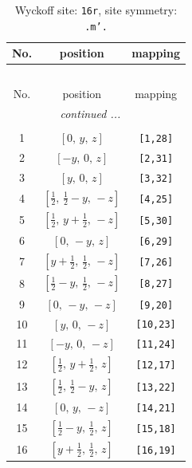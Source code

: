 \documentclass[fleqn,8pt]{jsarticle}
\begin{document}
\renewcommand{\arraystretch}{1.2}
\begin{longtable}{ccc}
\caption{Wyckoff site: {\tt 16r}, site symmetry: {\tt .m'.}}
 \\
 \hline \hline
No. & position & mapping \\ \hline \endfirsthead

\multicolumn{2}{l}{\tablename\ \thetable{}} \\
 \hline \hline
No. & position & mapping \\ \hline \endhead

 \hline \hline
\multicolumn{2}{r}{\footnotesize\it continued ...} \\ \endfoot

 \hline \hline
\multicolumn{2}{r}{} \\ \endlastfoot

1 & $\left[ 0,\, y,\, z \right]$ & {\tt [1,28]} \\ \hline
2 & $\left[ - y,\, 0,\, z \right]$ & {\tt [2,31]} \\ \hline
3 & $\left[ y,\, 0,\, z \right]$ & {\tt [3,32]} \\ \hline
4 & $\left[ \frac{1}{2},\, \frac{1}{2} - y,\, - z \right]$ & {\tt [4,25]} \\ \hline
5 & $\left[ \frac{1}{2},\, y + \frac{1}{2},\, - z \right]$ & {\tt [5,30]} \\ \hline
6 & $\left[ 0,\, - y,\, z \right]$ & {\tt [6,29]} \\ \hline
7 & $\left[ y + \frac{1}{2},\, \frac{1}{2},\, - z \right]$ & {\tt [7,26]} \\ \hline
8 & $\left[ \frac{1}{2} - y,\, \frac{1}{2},\, - z \right]$ & {\tt [8,27]} \\ \hline
9 & $\left[ 0,\, - y,\, - z \right]$ & {\tt [9,20]} \\ \hline
10 & $\left[ y,\, 0,\, - z \right]$ & {\tt [10,23]} \\ \hline
11 & $\left[ - y,\, 0,\, - z \right]$ & {\tt [11,24]} \\ \hline
12 & $\left[ \frac{1}{2},\, y + \frac{1}{2},\, z \right]$ & {\tt [12,17]} \\ \hline
13 & $\left[ \frac{1}{2},\, \frac{1}{2} - y,\, z \right]$ & {\tt [13,22]} \\ \hline
14 & $\left[ 0,\, y,\, - z \right]$ & {\tt [14,21]} \\ \hline
15 & $\left[ \frac{1}{2} - y,\, \frac{1}{2},\, z \right]$ & {\tt [15,18]} \\ \hline
16 & $\left[ y + \frac{1}{2},\, \frac{1}{2},\, z \right]$ & {\tt [16,19]} \\
\end{longtable}
\end{document}
